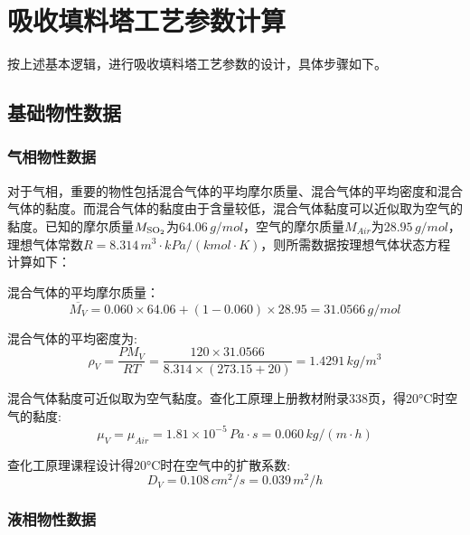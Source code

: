 \chapter{吸收填料塔工艺参数计算}

按上述基本逻辑，进行吸收填料塔工艺参数的设计\cite{Design-of-Packed-Absorption-Column}，具体步骤如下。

\section{基础物性数据}

\subsection{气相物性数据}

对于气相，重要的物性包括混合气体的平均摩尔质量、混合气体的平均密度和混合气体的黏度。而混合气体的黏度由于含量较低，混合气体黏度可以近似取为空气的黏度。已知的摩尔质量$M_{\ce{SO2}}$为$64.06 \, g/mol$，空气的摩尔质量$M_{Air}$为$28.95 \, g/mol$，理想气体常数$R=8.314 \, m^3 \cdot kPa/(kmol \cdot K)$，则所需数据按理想气体状态方程计算如下：

混合气体的平均摩尔质量：
\begin{equation}
	\overline{M_{V}} = 0.060 \times 64.06 + (1-0.060) \times 28.95 = 31.0566 \, g/mol
\end{equation}

混合气体的平均密度为:
\begin{equation}
	\rho_{V}=\frac{PM_{V}}{RT}=\frac{120\times31.0566}{8.314\times(273.15+20)}=1.4291 \, kg/m^3
\end{equation}

混合气体黏度可近似取为空气黏度。查化工原理上册教材附录338页，得20°C时空气的黏度:
\begin{equation}
	\mu_{V}	= \mu_{Air}=1.81\times10^{-5} \, Pa \cdot s = 0.060 \, kg/(m \cdot h)
\end{equation} 

查化工原理课程设计得20°C时在空气中的扩散系数:
\begin{equation}
	D_{V}=0.108 \, cm^2/s = 0.039 \, m^2/h
\end{equation}

\subsection{液相物性数据}

